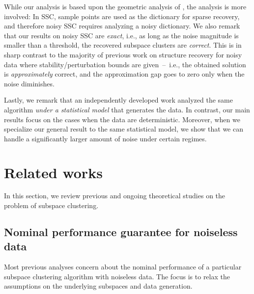 \documentclass{ctexart}
\begin{document}
While our analysis is based upon the geometric analysis of \cite{soltanolkotabi2011geometric}, the analysis is more involved: In SSC, sample points are used as the dictionary for sparse recovery, and therefore noisy SSC requires analyzing a noisy dictionary.
We also remark that our results on noisy SSC are {\em exact}, i.e., as long as the noise magnitude is smaller than a threshold, the recovered subspace clusters are {\em correct}.
This is in sharp contrast to the majority of previous work on structure recovery for noisy data where stability/perturbation bounds are given~--~i.e., the obtained solution is {\em approximately} correct, and the approximation gap goes to zero only when the noise diminishes.

Lastly, we remark that an independently developed work \cite{soltanolkotabi2013robust} analyzed the same algorithm {\em under a statistical model} that generates the data. In contrast, our main results focus on the cases when the data are deterministic. Moreover, when we specialize our general result to the same statistical model, we show that we can handle a significantly larger amount of noise under certain regimes.




\section{Related works}\label{sec:RelatedWorks}
In this section, we review  previous and ongoing theoretical studies on the problem of subspace clustering.

\subsection{Nominal performance guarantee for noiseless data}
Most previous analyses concern about the nominal performance of a particular subspace clustering algorithm with noiseless data. The focus is to relax the assumptions on the underlying subspaces and data generation.
\end{document}
